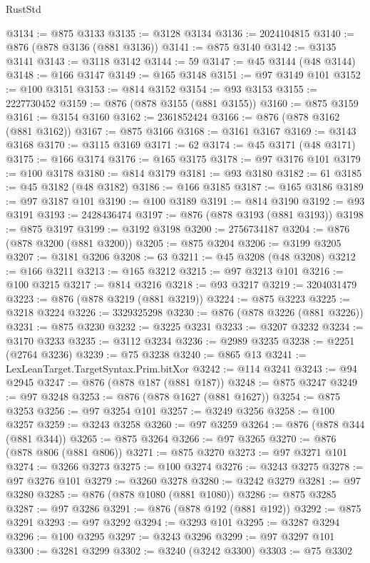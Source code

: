\begin{lexlean}{RustStd}
\begin{coremodule}
@3134 := @875 @3133
@3135 := @3128 @3134
@3136 := 2024104815
@3140 := @876 (@878 @3136 (@881 @3136))
@3141 := @875 @3140
@3142 := @3135 @3141
@3143 := @3118 @3142
@3144 := 59
@3147 := @45 @3144 (@48 @3144)
@3148 := @166 @3147
@3149 := @165 @3148
@3151 := @97 @3149 @101
@3152 := @100 @3151
@3153 := @814 @3152
@3154 := @93 @3153
@3155 := 2227730452
@3159 := @876 (@878 @3155 (@881 @3155))
@3160 := @875 @3159
@3161 := @3154 @3160
@3162 := 2361852424
@3166 := @876 (@878 @3162 (@881 @3162))
@3167 := @875 @3166
@3168 := @3161 @3167
@3169 := @3143 @3168
@3170 := @3115 @3169
@3171 := 62
@3174 := @45 @3171 (@48 @3171)
@3175 := @166 @3174
@3176 := @165 @3175
@3178 := @97 @3176 @101
@3179 := @100 @3178
@3180 := @814 @3179
@3181 := @93 @3180
@3182 := 61
@3185 := @45 @3182 (@48 @3182)
@3186 := @166 @3185
@3187 := @165 @3186
@3189 := @97 @3187 @101
@3190 := @100 @3189
@3191 := @814 @3190
@3192 := @93 @3191
@3193 := 2428436474
@3197 := @876 (@878 @3193 (@881 @3193))
@3198 := @875 @3197
@3199 := @3192 @3198
@3200 := 2756734187
@3204 := @876 (@878 @3200 (@881 @3200))
@3205 := @875 @3204
@3206 := @3199 @3205
@3207 := @3181 @3206
@3208 := 63
@3211 := @45 @3208 (@48 @3208)
@3212 := @166 @3211
@3213 := @165 @3212
@3215 := @97 @3213 @101
@3216 := @100 @3215
@3217 := @814 @3216
@3218 := @93 @3217
@3219 := 3204031479
@3223 := @876 (@878 @3219 (@881 @3219))
@3224 := @875 @3223
@3225 := @3218 @3224
@3226 := 3329325298
@3230 := @876 (@878 @3226 (@881 @3226))
@3231 := @875 @3230
@3232 := @3225 @3231
@3233 := @3207 @3232
@3234 := @3170 @3233
@3235 := @3112 @3234
@3236 := @2989 @3235
@3238 := @2251 (@2764 @3236)
@3239 := @75 @3238
@3240 := @865 @13
@3241 := LexLeanTarget.TargetSyntax.Prim.bitXor
@3242 := @114 @3241
@3243 := @94 @2945
@3247 := @876 (@878 @187 (@881 @187))
@3248 := @875 @3247
@3249 := @97 @3248
@3253 := @876 (@878 @1627 (@881 @1627))
@3254 := @875 @3253
@3256 := @97 @3254 @101
@3257 := @3249 @3256
@3258 := @100 @3257
@3259 := @3243 @3258
@3260 := @97 @3259
@3264 := @876 (@878 @344 (@881 @344))
@3265 := @875 @3264
@3266 := @97 @3265
@3270 := @876 (@878 @806 (@881 @806))
@3271 := @875 @3270
@3273 := @97 @3271 @101
@3274 := @3266 @3273
@3275 := @100 @3274
@3276 := @3243 @3275
@3278 := @97 @3276 @101
@3279 := @3260 @3278
@3280 := @3242 @3279
@3281 := @97 @3280
@3285 := @876 (@878 @1080 (@881 @1080))
@3286 := @875 @3285
@3287 := @97 @3286
@3291 := @876 (@878 @192 (@881 @192))
@3292 := @875 @3291
@3293 := @97 @3292
@3294 := @3293 @101
@3295 := @3287 @3294
@3296 := @100 @3295
@3297 := @3243 @3296
@3299 := @97 @3297 @101
@3300 := @3281 @3299
@3302 := @3240 (@3242 @3300)
@3303 := @75 @3302

\end{coremodule}
\end{lexlean}
